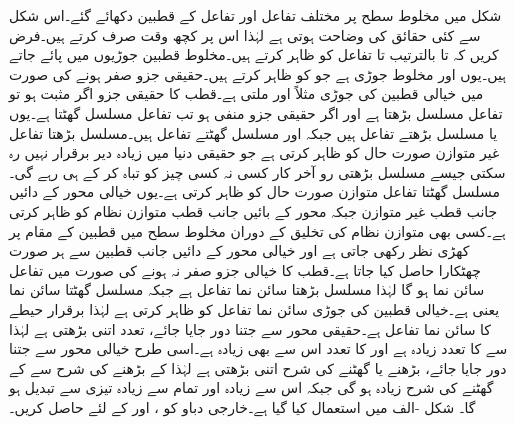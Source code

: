 شکل  میں مخلوط سطح پر مختلف تفاعل اور تفاعل کے  قطبین  دکھائے گئے۔اس شکل سے کئی حقائق کی وضاحت ہوتی ہے لہٰذا اس پر کچھ وقت صرف کرتے ہیں۔فرض کریں کہ  تا  بالترتیب  تا  تفاعل کو ظاہر کرتے ہیں۔مخلوط قطبین جوڑیوں میں پائے جاتے ہیں۔یوں  اور  مخلوط جوڑی ہے جو  کو ظاہر کرتے ہیں۔حقیقی جزو صفر ہونے کی صورت میں خیالی قطبین کی جوڑی مثلاً  اور  ملتی ہے۔قطب کا حقیقی جزو اگر مثبت ہو تو تفاعل مسلسل بڑھتا ہے اور اگر حقیقی  جزو منفی ہو تب تفاعل مسلسل گھٹتا ہے۔یوں  یا  مسلسل بڑھتے تفاعل ہیں جبکہ  اور  مسلسل گھٹتے تفاعل ہیں۔مسلسل بڑھتا تفاعل غیر متوازن صورت حال کو ظاہر کرتی ہے جو حقیقی دنیا میں زیادہ دیر برقرار نہیں رہ سکتی جیسے مسلسل بڑھتی رو آخر کار کسی نہ کسی چیز کو تباہ کر کے ہی رہے گی۔مسلسل گھٹتا تفاعل متوازن صورت حال کو ظاہر کرتی ہے۔یوں خیالی محور کے دائیں جانب قطب غیر متوازن جبکہ محور کے بائیں جانب قطب متوازن نظام کو ظاہر کرتی ہے۔کسی بھی متوازن نظام کی تخلیق کے دوران مخلوط سطح میں قطبین کے مقام پر کھڑی نظر رکھی جاتی ہے اور خیالی محور کے دائیں جانب قطبین سے ہر صورت چھٹکارا حاصل کیا جاتا ہے۔قطب کا خیالی جزو صفر نہ ہونے کی صورت میں تفاعل سائن نما ہو گا لہٰذا  مسلسل بڑھتا سائن نما تفاعل ہے جبکہ   مسلسل گھٹتا سائن نما یعنی  ہے۔خیالی قطبین کی جوڑی سائن نما تفاعل کو ظاہر کرتی ہے لہٰذا  برقرار حیطے کا سائن نما تفاعل ہے۔حقیقی محور سے جتنا دور جایا جائے، تعدد اتنی بڑھتی ہے لہٰذا  سے  کا تعدد زیادہ ہے اور  کا تعدد اس سے بھی زیادہ ہے۔اسی طرح خیالی محور سے جتنا دور جایا جائے، بڑھنے یا گھٹنے کی شرح اتنی بڑھتی ہے لہٰذا  کے بڑھنے کی شرح سے  کے گھٹنے کی شرح زیادہ ہو گی جبکہ  اس سے زیادہ اور  تمام سے زیادہ تیزی سے تبدیل ہو گا۔
شکل -الف میں  استعمال کیا گیا ہے۔خارجی دباو  کو ،  اور  کے لئے حاصل کریں۔
